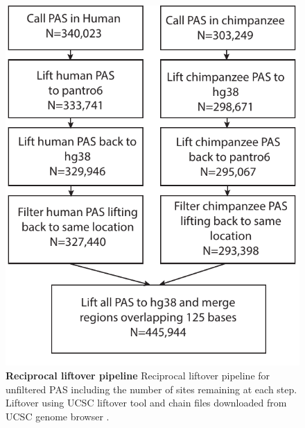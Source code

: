 \begin{figure}[!htb]
\centering
\includegraphics[width=5in]{img/ch03/Fig1_figSup10.pdf}
\caption[Reciprocal liftover pipeline]{\textbf{Reciprocal liftover pipeline} Reciprocal liftover pipeline for unfiltered PAS including the number of sites remaining at each step. Liftover using UCSC liftover tool and chain files downloaded from UCSC genome browser \citep{kent_human_2002}. }
\label{fig:ch03-liftover}
\end{figure}
\clearpage



